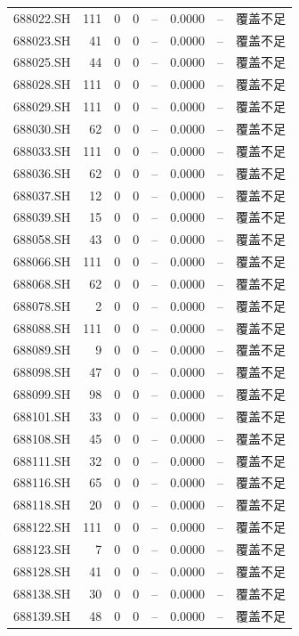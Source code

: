 \documentclass[10pt,a4paper]{article}
\begin{document}
\begin{longtable}{lrrr r r r l}
688022.SH & 111 & 0 & 0 & -- & 0.0000 & -- & 覆盖不足\\
688023.SH & 41 & 0 & 0 & -- & 0.0000 & -- & 覆盖不足\\
688025.SH & 44 & 0 & 0 & -- & 0.0000 & -- & 覆盖不足\\
688028.SH & 111 & 0 & 0 & -- & 0.0000 & -- & 覆盖不足\\
688029.SH & 111 & 0 & 0 & -- & 0.0000 & -- & 覆盖不足\\
688030.SH & 62 & 0 & 0 & -- & 0.0000 & -- & 覆盖不足\\
688033.SH & 111 & 0 & 0 & -- & 0.0000 & -- & 覆盖不足\\
688036.SH & 62 & 0 & 0 & -- & 0.0000 & -- & 覆盖不足\\
688037.SH & 12 & 0 & 0 & -- & 0.0000 & -- & 覆盖不足\\
688039.SH & 15 & 0 & 0 & -- & 0.0000 & -- & 覆盖不足\\
688058.SH & 43 & 0 & 0 & -- & 0.0000 & -- & 覆盖不足\\
688066.SH & 111 & 0 & 0 & -- & 0.0000 & -- & 覆盖不足\\
688068.SH & 62 & 0 & 0 & -- & 0.0000 & -- & 覆盖不足\\
688078.SH & 2 & 0 & 0 & -- & 0.0000 & -- & 覆盖不足\\
688088.SH & 111 & 0 & 0 & -- & 0.0000 & -- & 覆盖不足\\
688089.SH & 9 & 0 & 0 & -- & 0.0000 & -- & 覆盖不足\\
688098.SH & 47 & 0 & 0 & -- & 0.0000 & -- & 覆盖不足\\
688099.SH & 98 & 0 & 0 & -- & 0.0000 & -- & 覆盖不足\\
688101.SH & 33 & 0 & 0 & -- & 0.0000 & -- & 覆盖不足\\
688108.SH & 45 & 0 & 0 & -- & 0.0000 & -- & 覆盖不足\\
688111.SH & 32 & 0 & 0 & -- & 0.0000 & -- & 覆盖不足\\
688116.SH & 65 & 0 & 0 & -- & 0.0000 & -- & 覆盖不足\\
688118.SH & 20 & 0 & 0 & -- & 0.0000 & -- & 覆盖不足\\
688122.SH & 111 & 0 & 0 & -- & 0.0000 & -- & 覆盖不足\\
688123.SH & 7 & 0 & 0 & -- & 0.0000 & -- & 覆盖不足\\
688128.SH & 41 & 0 & 0 & -- & 0.0000 & -- & 覆盖不足\\
688138.SH & 30 & 0 & 0 & -- & 0.0000 & -- & 覆盖不足\\
688139.SH & 48 & 0 & 0 & -- & 0.0000 & -- & 覆盖不足\\

\end{longtable}
\end{document}
